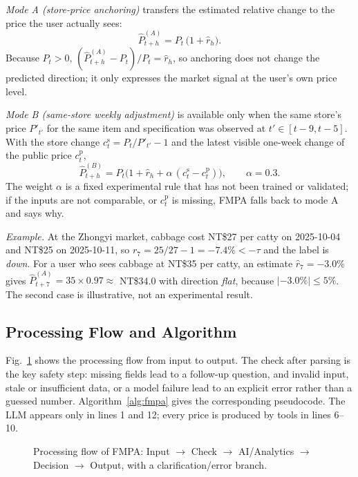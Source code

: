 \textit{Mode A (store-price anchoring)} transfers the estimated relative change
to the price the user actually sees:
\begin{equation}
\hat{P}^{(A)}_{t+h}=P_t\,\bigl(1+\hat{r}_h\bigr).
\label{eq:modeA}
\end{equation}
Because $P_t>0$, $(\hat{P}^{(A)}_{t+h}-P_t)/P_t=\hat{r}_h$, so anchoring does
not change the predicted direction; it only expresses the market signal at the
user's own price level.

\textit{Mode B (same-store weekly adjustment)} is available only when the same
store's price $P'_{t'}$ for the same item and specification was observed at
$t'\in[t-9,t-5]$. With the store change $c^{\mathrm{s}}_t=P_t/P'_{t'}-1$ and
the latest visible one-week change of the public price $c^{\mathrm{p}}_t$,
\begin{equation}
\hat{P}^{(B)}_{t+h}=P_t\bigl(1+\hat{r}_h+\alpha\,(c^{\mathrm{s}}_t-c^{\mathrm{p}}_t)\bigr),
\qquad \alpha=0.3 .
\label{eq:modeB}
\end{equation}
The weight $\alpha$ is a fixed experimental rule that has not been trained or
validated; if the inputs are not comparable, or $c^{\mathrm{p}}_t$ is missing,
FMPA falls back to mode A and says why.



\textit{Example.} At the Zhongyi market, cabbage cost NT\$27 per catty on
2025-10-04 and NT\$25 on 2025-10-11, so $r_7=25/27-1=-7.4\%<-\tau$ and the
label is \emph{down}. For a user who sees cabbage at NT\$35 per catty, an
estimate $\hat{r}_7=-3.0\%$ gives $\hat{P}^{(A)}_{t+7}=35\times0.97\approx$
NT\$34.0 with direction \emph{flat}, because $|-3.0\%|\le5\%$. The second case
is illustrative, not an experimental result.

\subsection{Processing Flow and Algorithm}
Fig.~\ref{fig:flowchart} shows the processing flow from input to output. The
check after parsing is the key safety step: missing fields lead to a follow-up
question, and invalid input, stale or insufficient data, or a model failure
lead to an explicit error rather than a guessed number.
Algorithm~\ref{alg:fmpa} gives the corresponding pseudocode. The LLM appears
only in lines 1 and 12; every price is produced by tools in lines 6--10.

\begin{figure}[t]
\centering

\caption{Processing flow of FMPA: Input $\rightarrow$ Check $\rightarrow$
AI/Analytics $\rightarrow$ Decision $\rightarrow$ Output, with a
clarification/error branch.}
\label{fig:flowchart}
\end{figure}

